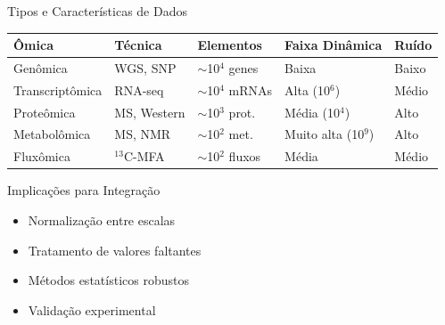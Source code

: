 \begin{frame}{Tipos e Características de Dados}
\begin{center}
\begin{tabular}{lllll}
\toprule
\textbf{Ômica} & \textbf{Técnica} & \textbf{Elementos} & \textbf{Faixa Dinâmica} & \textbf{Ruído} \\
\midrule
Genômica & WGS, SNP & $\sim$10$^4$ genes & Baixa & Baixo \\
Transcriptômica & RNA-seq & $\sim$10$^4$ mRNAs & Alta (10$^6$) & Médio \\
Proteômica & MS, Western & $\sim$10$^3$ prot. & Média (10$^4$) & Alto \\
Metabolômica & MS, NMR & $\sim$10$^2$ met. & Muito alta (10$^9$) & Alto \\
Fluxômica & $^{13}$C-MFA & $\sim$10$^2$ fluxos & Média & Médio \\
\bottomrule
\end{tabular}
\end{center}

\vspace{0.3cm}

\begin{exampleblock}{Implicações para Integração}
\begin{itemize}
    \item Normalização entre escalas
    \item Tratamento de valores faltantes
    \item Métodos estatísticos robustos
    \item Validação experimental
\end{itemize}
\end{exampleblock}
\end{frame}

